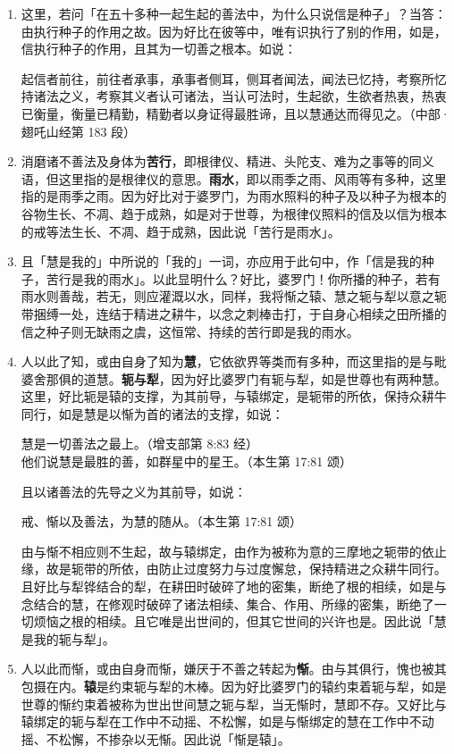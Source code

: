 \begin{enumerate}
\item 这里，若问「在五十多种一起生起的善法中，为什么只说信是种子」？当答：由执行种子的作用之故。因为好比在彼等中，唯有识执行了别的作用，如是，信执行种子的作用，且其为一切善之根本。如说：\begin{quoting}起信者前往，前往者承事，承事者侧耳，侧耳者闻法，闻法已忆持，考察所忆持诸法之义，考察其义者认可诸法，当认可法时，生起欲，生欲者热衷，热衷已衡量，衡量已精勤，精勤者以身证得最胜谛，且以慧通达而得见之。（中部·翅吒山经第 183 段）\end{quoting}
\item 消磨诸不善法及身体为\textbf{苦行}，即根律仪、精进、头陀支、难为之事等的同义语，但这里指的是根律仪的意思。\textbf{雨水}，即以雨季之雨、风雨等有多种，这里指的是雨季之雨。因为好比对于婆罗门，为雨水照料的种子及以种子为根本的谷物生长、不凋、趋于成熟，如是对于世尊，为根律仪照料的信及以信为根本的戒等法生长、不凋、趋于成熟，因此说「苦行是雨水」。
\item 且「慧是我的」中所说的「我的」一词，亦应用于此句中，作「信是我的种子，苦行是我的雨水」。以此显明什么？好比，婆罗门！你所播的种子，若有雨水则善哉，若无，则应灌溉以水，同样，我将惭之辕、慧之轭与犁以意之轭带捆缚一处，连结于精进之耕牛，以念之刺棒击打，于自身心相续之田所播的信之种子则无缺雨之虞，这恒常、持续的苦行即是我的雨水。
\item 人以此了知，或由自身了知为\textbf{慧}，它依欲界等类而有多种，而这里指的是与毗婆舍那俱的道慧。\textbf{轭与犁}，因为好比婆罗门有轭与犁，如是世尊也有两种慧。这里，好比轭是辕的支撑，为其前导，与辕绑定，是轭带的所依，保持众耕牛同行，如是慧是以惭为首的诸法的支撑，如说：\begin{quoting}慧是一切善法之最上。（增支部第 8:83 经）\\他们说慧是最胜的善，如群星中的星王。（本生第 17:81 颂）\end{quoting}且以诸善法的先导之义为其前导，如说：\begin{quoting}戒、惭以及善法，为慧的随从。（本生第 17:81 颂）\end{quoting}由与惭不相应则不生起，故与辕绑定，由作为被称为意的三摩地之轭带的依止缘，故是轭带的所依，由防止过度努力与过度懈怠，保持精进之众耕牛同行。且好比与犁铧结合的犁，在耕田时破碎了地的密集，断绝了根的相续，如是与念结合的慧，在修观时破碎了诸法相续、集合、作用、所缘的密集，断绝了一切烦恼之根的相续。且它唯是出世间的，但其它世间的兴许也是。因此说「慧是我的轭与犁」。
\item 人以此而惭，或由自身而惭，嫌厌于不善之转起为\textbf{惭}。由与其俱行，愧也被其包摄在内。\textbf{辕}是约束轭与犁的木棒。因为好比婆罗门的辕约束着轭与犁，如是世尊的惭约束着被称为世出世间慧之轭与犁，当无惭时，慧即不存。又好比与辕绑定的轭与犁在工作中不动摇、不松懈，如是与惭绑定的慧在工作中不动摇、不松懈，不掺杂以无惭。因此说「惭是辕」。

\end{enumerate}
